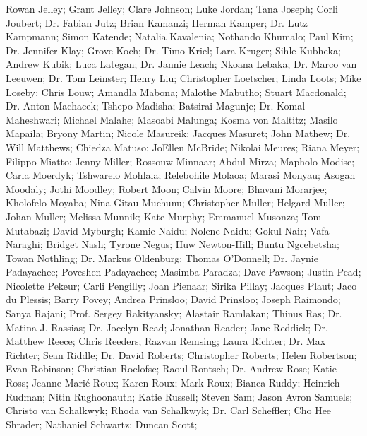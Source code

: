     Rowan Jelley;
    Grant Jelley;
    Clare Johnson;
    Luke Jordan;
    Tana Joseph;
Corli Joubert;
Dr. Fabian Jutz;
    Brian Kamanzi;
Herman Kamper;
Dr. Lutz Kampmann;
    Simon Katende;
    Natalia Kavalenia;
    Nothando Khumalo;
    Paul Kim;
Dr. Jennifer Klay;
Grove Koch;
Dr. Timo Kriel;
    Lara Kruger;
    Sihle Kubheka;
    Andrew Kubik;
Luca Lategan;
Dr. Jannie Leach;
    Nkoana Lebaka;
Dr. Marco van Leeuwen;
Dr. Tom Leinster;
    Henry Liu;
    Christopher Loetscher;
Linda Loots;
    Mike Loseby;
Chris Louw;
    Amandla Mabona;
    Malothe Mabutho;
    Stuart Macdonald;
Dr. Anton Machacek;
    Tshepo Madisha;
    Batsirai Magunje;
Dr. Komal Maheshwari;
    Michael Malahe;
    Masoabi Malunga;
    Kosma von Maltitz;
    Masilo Mapaila;
    Bryony Martin;
    Nicole Masureik;
Jacques Masuret;
    John Mathew;
Dr. Will Matthews;
    Chiedza Matuso;
    JoEllen McBride;
    Nikolai Meures;
    Riana Meyer;
    Filippo Miatto;
    Jenny Miller;
Rossouw Minnaar;
    Abdul Mirza;
    Mapholo Modise;
    Carla Moerdyk;
    Tshwarelo Mohlala;
    Relebohile Molaoa;
    Marasi Monyau;
    Asogan Moodaly;
    Jothi Moodley;
    Robert Moon;
    Calvin Moore;
    Bhavani Morarjee;
    Kholofelo Moyaba;
    Nina Gitau Muchunu;
Christopher Muller;
Helgard Muller;
Johan Muller;
Melissa Munnik;
    Kate Murphy;
    Emmanuel Musonza;
    Tom Mutabazi;
    David Myburgh;
    Kamie Naidu;
    Nolene Naidu;
    Gokul Nair;
    Vafa Naraghi;
    Bridget Nash;
    Tyrone Negus;
    Huw Newton-Hill;
    Buntu Ngcebetsha;
Towan Nothling;
Dr. Markus Oldenburg;
    Thomas O’Donnell;
Dr. Jaynie Padayachee;
    Poveshen Padayachee;
    Masimba Paradza;
    Dave Pawson;
    Justin Pead;
    Nicolette Pekeur;
Carli Pengilly;
Joan Pienaar;
    Sirika Pillay;
    Jacques Plaut;
Jaco du Plessis;
    Barry Povey;
    Andrea Prinsloo;
David Prinsloo;
    Joseph Raimondo;
    Sanya Rajani;
Prof. Sergey Rakityansky;
    Alastair Ramlakan;
Thinus Ras;
Dr. Matina J. Rassias;
Dr. Jocelyn Read;
    Jonathan Reader;
    Jane Reddick;
Dr. Matthew Reece;
Chris Reeders;
    Razvan Remsing;
    Laura Richter;
Dr.   Max Richter;
    Sean Riddle;
Dr. David Roberts;
    Christopher Roberts;
    Helen Robertson;
    Evan Robinson;
Christian Roelofse;
    Raoul Rontsch;
Dr. Andrew Rose;
    Katie Ross;
    Jeanne-Marié Roux;
Karen Roux;
    Mark Roux;
    Bianca Ruddy;
Heinrich Rudman;
    Nitin Rughoonauth;
    Katie Russell;
    Steven Sam;
Jason Avron Samuels;
Christo van Schalkwyk;
Rhoda  van Schalkwyk;
Dr. Carl Scheffler;
    Cho Hee Shrader;
    Nathaniel Schwartz;
    Duncan Scott;
